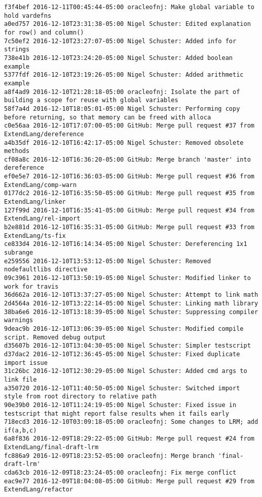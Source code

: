 \begin{lstlisting}
f3f4bef 2016-12-11T00:45:44-05:00 oracleofnj: Make global variable to hold vardefns
a0ed757 2016-12-10T23:31:38-05:00 Nigel Schuster: Edited explanation for row() and column()
7c50ef2 2016-12-10T23:27:07-05:00 Nigel Schuster: Added info for strings
738e41b 2016-12-10T23:24:20-05:00 Nigel Schuster: Added boolean example
5377fdf 2016-12-10T23:19:26-05:00 Nigel Schuster: Added arithmetic example
a8f4ad9 2016-12-10T21:28:18-05:00 oracleofnj: Isolate the part of building a scope for reuse with global variables
58f7a4d 2016-12-10T18:05:01-05:00 Nigel Schuster: Performing copy before returning, so that memory can be freed with alloca
c0e56aa 2016-12-10T17:07:00-05:00 GitHub: Merge pull request #37 from ExtendLang/dereference
a4b35df 2016-12-10T16:42:17-05:00 Nigel Schuster: Removed obsolete methods
cf08a8c 2016-12-10T16:36:20-05:00 GitHub: Merge branch 'master' into dereference
ef0e5e7 2016-12-10T16:36:03-05:00 GitHub: Merge pull request #36 from ExtendLang/comp-warn
0177dc2 2016-12-10T16:35:50-05:00 GitHub: Merge pull request #35 from ExtendLang/linker
127f99d 2016-12-10T16:35:41-05:00 GitHub: Merge pull request #34 from ExtendLang/rel-import
b2e881d 2016-12-10T16:35:31-05:00 GitHub: Merge pull request #33 from ExtendLang/ts-fix
ce833d4 2016-12-10T16:14:34-05:00 Nigel Schuster: Dereferencing 1x1 subrange
e259556 2016-12-10T13:53:12-05:00 Nigel Schuster: Removed nodefaultlibs directive
09c3961 2016-12-10T13:50:19-05:00 Nigel Schuster: Modified linker to work for travis
36d662a 2016-12-10T13:37:27-05:00 Nigel Schuster: Attempt to link math
2d4564a 2016-12-10T13:22:14-05:00 Nigel Schuster: Linking math library
38ba6e6 2016-12-10T13:18:39-05:00 Nigel Schuster: Suppressing compiler warnings
9deac9b 2016-12-10T13:06:39-05:00 Nigel Schuster: Modified compile script. Removed debug output
d35607b 2016-12-10T13:04:30-05:00 Nigel Schuster: Simpler testscript
d37dac2 2016-12-10T12:36:45-05:00 Nigel Schuster: Fixed duplicate import issue
31c26bc 2016-12-10T12:30:29-05:00 Nigel Schuster: Added cmd args to link file
a350720 2016-12-10T11:40:50-05:00 Nigel Schuster: Switched import style from root directory to relative path
90e39b0 2016-12-10T11:24:19-05:00 Nigel Schuster: Fixed issue in testscript that might report false results when it fails early
718ecd3 2016-12-10T03:09:18-05:00 oracleofnj: Some changes to LRM; add if(a,b,c)
6a8f836 2016-12-09T18:29:22-05:00 GitHub: Merge pull request #24 from ExtendLang/final-draft-lrm
fc886a9 2016-12-09T18:23:52-05:00 oracleofnj: Merge branch 'final-draft-lrm'
cda63cb 2016-12-09T18:23:24-05:00 oracleofnj: Fix merge conflict
eac9e77 2016-12-09T18:04:08-05:00 GitHub: Merge pull request #29 from ExtendLang/refactor

\end{lstlisting}
